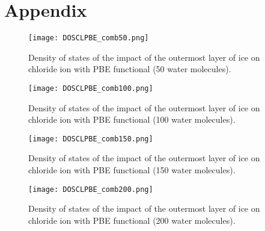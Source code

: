 \documentclass[a4paper,11pt]{report}
\begin{document}
\section{Appendix}
\begin{figure}[H]\large
\texttt{[image: DOSCLPBE\_comb50.png]}
\caption{Density of states of the impact of the outermost layer of ice on chloride ion with PBE functional (50 water molecules).}
\label{figure1b}
\end{figure}

\begin{figure}[H]\large
\texttt{[image: DOSCLPBE\_comb100.png]}
\caption{Density of states of the impact of the outermost layer of ice on chloride ion with PBE functional (100 water molecules).}
\label{figure2b}
\end{figure}

\begin{figure}[H]\large
\texttt{[image: DOSCLPBE\_comb150.png]}
\caption{Density of states of the impact of the outermost layer of ice on chloride ion with PBE functional (150 water molecules).}
\label{figure3b}
\end{figure}

\begin{figure}[H]\large
\texttt{[image: DOSCLPBE\_comb200.png]}
\caption{Density of states of the impact of the outermost layer of ice on chloride ion with PBE functional (200 water molecules).}
\label{figure4b}
\end{figure}











\end{document}
